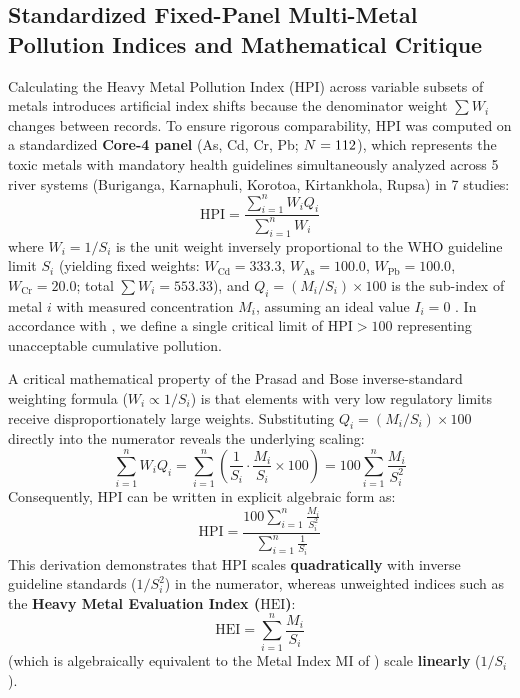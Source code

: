 \documentclass[authoryear,preprint,12pt]{elsarticle}
\begin{document}
\subsection{Standardized Fixed-Panel Multi-Metal Pollution Indices and Mathematical Critique}
Calculating the Heavy Metal Pollution Index ($\mathrm{HPI}$) across variable subsets of metals introduces artificial index shifts because the denominator weight $\sum W_i$ changes between records. To ensure rigorous comparability, $\mathrm{HPI}$ was computed on a standardized \textbf{Core-4 panel} (As, Cd, Cr, Pb; $N=112$), which represents the toxic metals with mandatory health guidelines simultaneously analyzed across 5 river systems (Buriganga, Karnaphuli, Korotoa, Kirtankhola, Rupsa) in 7 studies:
\begin{equation}
\mathrm{HPI} = \frac{\sum_{i=1}^n W_i Q_i}{\sum_{i=1}^n W_i}
\end{equation}
where $W_i = 1/S_i$ is the unit weight inversely proportional to the WHO guideline limit $S_i$ (yielding fixed weights: $W_{\mathrm{Cd}} = 333.3$, $W_{\mathrm{As}} = 100.0$, $W_{\mathrm{Pb}} = 100.0$, $W_{\mathrm{Cr}} = 20.0$; total $\sum W_i = 553.33$), and $Q_i = (M_i / S_i) \times 100$ is the sub-index of metal $i$ with measured concentration $M_i$, assuming an ideal value $I_i = 0$ \citep{Mohan1996,Prasad2001}. In accordance with \citet{Prasad2001}, we define a single critical limit of $\mathrm{HPI} > 100$ representing unacceptable cumulative pollution.

A critical mathematical property of the Prasad and Bose inverse-standard weighting formula ($W_i \propto 1/S_i$) is that elements with very low regulatory limits receive disproportionately large weights. Substituting $Q_i = (M_i / S_i) \times 100$ directly into the numerator reveals the underlying scaling:
\begin{equation}
\sum_{i=1}^n W_i Q_i = \sum_{i=1}^n \left( \frac{1}{S_i} \cdot \frac{M_i}{S_i} \times 100 \right) = 100 \sum_{i=1}^n \frac{M_i}{S_i^2}
\end{equation}
Consequently, $\mathrm{HPI}$ can be written in explicit algebraic form as:
\begin{equation}
\mathrm{HPI} = \frac{100 \sum_{i=1}^n \frac{M_i}{S_i^2}}{\sum_{i=1}^n \frac{1}{S_i}}
\end{equation}
This derivation demonstrates that $\mathrm{HPI}$ scales \textbf{quadratically} with inverse guideline standards ($1/S_i^2$) in the numerator, whereas unweighted indices such as the \textbf{Heavy Metal Evaluation Index ($\mathrm{HEI}$)}:
\begin{equation}
\mathrm{HEI} = \sum_{i=1}^n \frac{M_i}{S_i}
\end{equation}
(which is algebraically equivalent to the Metal Index $\mathrm{MI}$ of \citealt{Tamasi2004}) scale \textbf{linearly} ($1/S_i$). 
\end{document}
